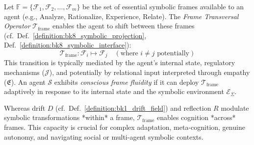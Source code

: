 \begin{definition}
\label{definition:bk9_frame_transversal_operator}
Let $\mathbb{F} = \{\mathcal{F}_1, \mathcal{F}_2, \dots, \mathcal{F}_m\}$ be the set of essential symbolic frames available to an agent (e.g., Analyze, Rationalize, Experience, Relate). The \emph{Frame Transversal Operator} $\mathcal{T}_{\text{frame}}$ enables the agent to shift between these frames (cf.~Def.~\ref{definition:bk8_symbolic_projection}, Def.~\ref{definition:bk8_symbolic_interface}):
\[
\mathcal{T}_{\text{frame}} : \mathcal{F}_i \mapsto \mathcal{F}_j \quad (\text{where } i \ne j \text{ potentially})
\]
This transition is typically mediated by the agent's internal state, regulatory mechanisms ($\mathcal{J}$), and potentially by relational input interpreted through empathy ($\mathfrak{E}$). An agent $\mathcal{S}$ exhibits \emph{conscious frame fluidity} if it can deploy $\mathcal{T}_{\text{frame}}$ adaptively in response to its internal state and the symbolic environment $\mathcal{E}_\Sigma$.
\end{definition}
\begin{remark}
\label{remark:bk9_cross_modality_cognition}
Whereas drift $D$ (cf.~Def.~\ref{definition:bk1_drift_field}) and reflection $R$ modulate symbolic transformations *within* a frame, $\mathcal{T}_{\text{frame}}$ enables cognition *across* frames. This capacity is crucial for complex adaptation, meta-cognition, genuine autonomy, and navigating social or multi-agent symbolic contexts.
\end{remark}
